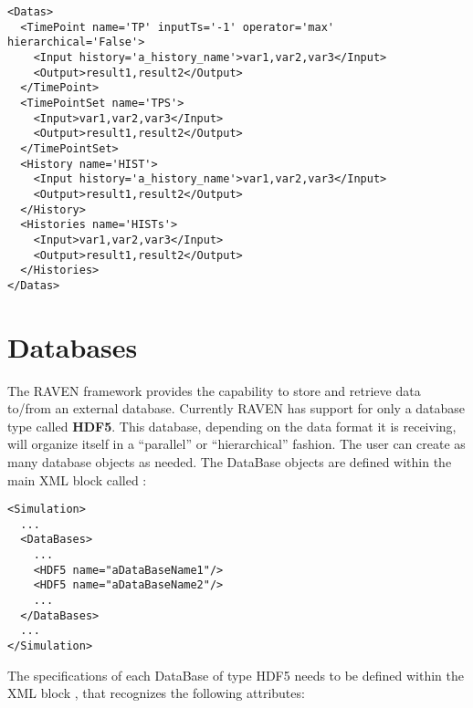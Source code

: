 \begin{lstlisting}[style=XML,morekeywords={inputTs,operator,hierarchical,name,history}]
<Datas>
  <TimePoint name='TP' inputTs='-1' operator='max' hierarchical='False'>
    <Input history='a_history_name'>var1,var2,var3</Input>
    <Output>result1,result2</Output>
  </TimePoint>
  <TimePointSet name='TPS'>
    <Input>var1,var2,var3</Input>
    <Output>result1,result2</Output>
  </TimePointSet>
  <History name='HIST'>
    <Input history='a_history_name'>var1,var2,var3</Input>
    <Output>result1,result2</Output>
  </History>
  <Histories name='HISTs'>
    <Input>var1,var2,var3</Input>
    <Output>result1,result2</Output>
  </Histories>
</Datas>
\end{lstlisting}

\section{Databases}
\label{sec:Databases}
The RAVEN framework provides the capability to store and retrieve data to/from
an external database.
%
Currently RAVEN has support for only a database type called \textbf{HDF5}.
%
This database, depending on the data format it is receiving, will organize
itself in a ``parallel'' or ``hierarchical'' fashion.
%
The user can create as many database objects as needed.
%
The DataBase objects are defined within the main XML block called
:
\begin{lstlisting}[style=XML]
<Simulation>
  ...
  <DataBases>
    ...
    <HDF5 name="aDataBaseName1"/>
    <HDF5 name="aDataBaseName2"/>
    ...
  </DataBases>
  ...
</Simulation>
\end{lstlisting}
The specifications of each DataBase of type HDF5 needs to be defined within the
XML block , that recognizes the following attributes:
\vspace{-5mm}

